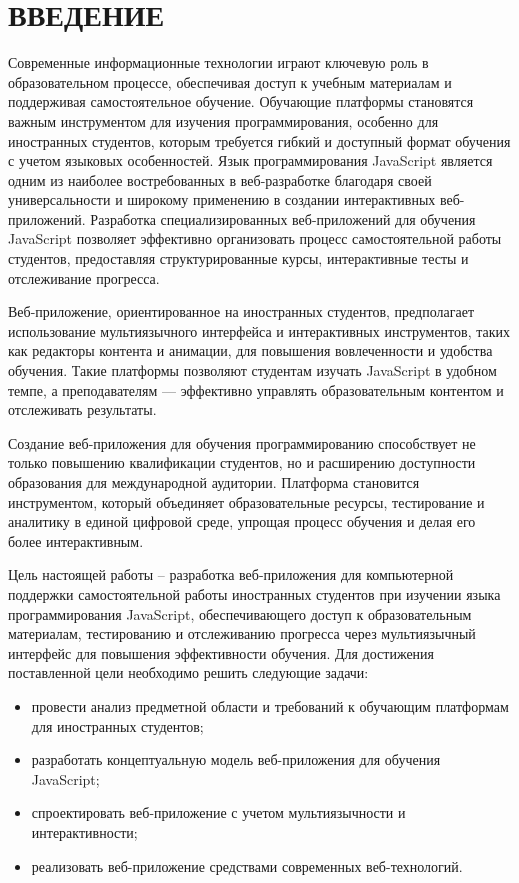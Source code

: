 \section*{ВВЕДЕНИЕ}

Современные информационные технологии играют ключевую роль в образовательном процессе, обеспечивая доступ к учебным материалам и поддерживая самостоятельное обучение. Обучающие платформы становятся важным инструментом для изучения программирования, особенно для иностранных студентов, которым требуется гибкий и доступный формат обучения с учетом языковых особенностей. Язык программирования JavaScript является одним из наиболее востребованных в веб-разработке благодаря своей универсальности и широкому применению в создании интерактивных веб-приложений. Разработка специализированных веб-приложений для обучения JavaScript позволяет эффективно организовать процесс самостоятельной работы студентов, предоставляя структурированные курсы, интерактивные тесты и отслеживание прогресса.

Веб-приложение, ориентированное на иностранных студентов, предполагает использование мультиязычного интерфейса и интерактивных инструментов, таких как редакторы контента и анимации, для повышения вовлеченности и удобства обучения. Такие платформы позволяют студентам изучать JavaScript в удобном темпе, а преподавателям — эффективно управлять образовательным контентом и отслеживать результаты.

Создание веб-приложения для обучения программированию способствует не только повышению квалификации студентов, но и расширению доступности образования для международной аудитории. Платформа становится инструментом, который объединяет образовательные ресурсы, тестирование и аналитику в единой цифровой среде, упрощая процесс обучения и делая его более интерактивным.

Цель настоящей работы – разработка веб-приложения для компьютерной поддержки самостоятельной работы иностранных студентов при изучении языка программирования JavaScript, обеспечивающего доступ к образовательным материалам, тестированию и отслеживанию прогресса через мультиязычный интерфейс для повышения эффективности обучения. Для достижения поставленной цели необходимо решить следующие задачи:
\begin{itemize}
	\item провести анализ предметной области и требований к обучающим платформам для иностранных студентов;
	\item разработать концептуальную модель веб-приложения для обучения JavaScript;
	\item спроектировать веб-приложение с учетом мультиязычности и интерактивности;
	\item реализовать веб-приложение средствами современных веб-технологий.
\end{itemize}

